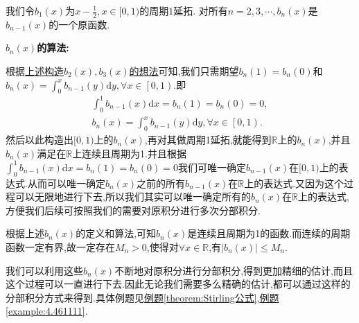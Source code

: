 \documentclass[../../main.tex]{subfiles}%
\begin{document}
\begin{definition}[\(b_n(x)\)定义和算法]\label{definition:b_n(x)定义和算法}
我们令\(b_1(x)\)为\(x-\frac{1}{2},x\in[0,1)\)的周期\(1\)延拓. 对所有\(n=2,3,\cdots,b_n(x)\)是\(b_{n - 1}(x)\)的一个原函数.
\end{definition}
\begin{note}
\textbf{\(b_n(x)\)的算法:}

根据\hyperlink{remark:利用0阶E-M公式精细估阶的构造}{上述构造$b_2(x),b_3(x)$的想法}可知,我们只需期望\(b_n(1)=b_n(0)\)和$b_n(x)=\int_0^x{b_{n-1}\left( y \right) \mathrm{d}y},\forall x\in \left[ 0,1 \right) $.即
\begin{gather*}
\int_{0}^{1}b_{n-1}(x)\mathrm{d}x =b_n(1)=b_n(0)= 0,
\\
b_n(x)=\int_0^x{b_{n-1}\left( y \right) \mathrm{d}y},\forall x\in \left[ 0,1 \right).
\end{gather*}
然后以此构造出$[0,1)$上的$b_n(x)$,再对其做周期1延拓,就能得到$\mathbb{R}$上的$b_n(x)$,并且$b_n(x)$满足在$\mathbb{R}$上连续且周期为1.并且根据$\int_{0}^{1}b_{n-1}(x)\mathrm{d}x =b_n(1)=b_n(0)= 0$我们可唯一确定\(b_{n-1}(x)\)在\([0,1)\)上的表达式.从而可以唯一确定$b_n(x)$之前的所有\(b_{n-1}(x)\)在\(\mathbb{R}\)上的表达式.又因为这个过程可以无限地进行下去,所以我们其实可以唯一确定所有的\(b_n(x)\)在\(\mathbb{R}\)上的表达式,方便我们后续可按照我们的需要对原积分进行多次分部积分.

根据上述$b_n(x)$的定义和算法,可知$b_n(x)$是连续且周期为1的函数.而连续的周期函数一定有界,故一定存在$M_n>0$,使得对$\forall x\in \mathbb{R}$,有$\left| b_n(x) \right|\leqslant M_n$.
\end{note}
\begin{remark}
我们可以利用这些$b_n(x)$不断地对原积分进行分部积分,得到更加精细的估计,而且这个过程可以一直进行下去.因此无论我们需要多么精确的估计,都可以通过这样的分部积分方式来得到.具体例题见\hyperref[theorem:Stirling公式]{例题\ref{theorem:Stirling公式}},\hyperref[example:4.461111]{例题\ref{example:4.461111}}.
\end{remark}
\end{document}
